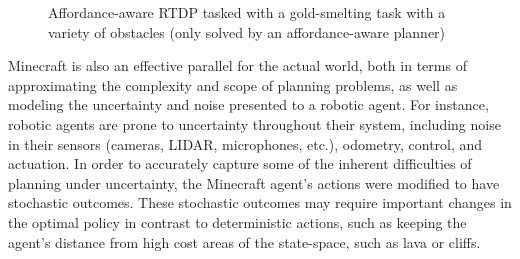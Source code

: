 \documentclass[letterpaper]{article}
\begin{document}
\begin{figure}
\centering
{}%
%
%
%
  \caption{Affordance-aware RTDP tasked with a gold-smelting task with a variety of obstacles
  (only solved by an affordance-aware planner)}
  \label{fig:epicworld}
\end{figure}

Minecraft is also an effective parallel for the actual world, both
in terms of approximating the complexity and scope of planning
problems, as well as modeling the uncertainty and noise presented to a
robotic agent.  For instance, robotic agents are prone to
uncertainty throughout their system, including noise in their
sensors (cameras, LIDAR, microphones, etc.), odometry, control, and
actuation.  In order to accurately capture some of the inherent
difficulties of planning under uncertainty, the Minecraft agent's
actions were modified to have stochastic outcomes. These stochastic
outcomes may require important changes in the optimal policy in
contrast to deterministic actions, such as keeping the agent's
distance from high cost areas of the state-space, such as lava or cliffs.
\end{document}
